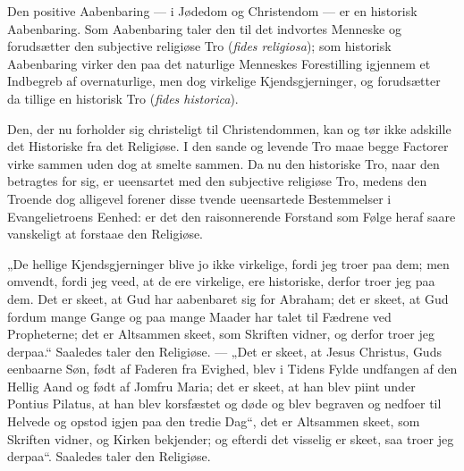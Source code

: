 \documentclass[12pt,a4paper]{book}
\newcommand{\opage}[1]{\marginnote{\footnotesize\textit{[#1]}}}
\begin{document}
\opage{14} Den positive Aabenbaring --- i Jødedom og Christendom --- er en historisk
Aabenbaring. Som Aabenbaring taler den til det indvortes Menneske og
forudsætter den subjective religiøse Tro (\textit{fides religiosa}); som
historisk Aabenbaring virker den paa det naturlige Menneskes Forestilling
igjennem et Indbegreb af overnaturlige, men dog virkelige Kjendsgjerninger, og
forudsætter da tillige en historisk Tro (\textit{fides historica}).

Den, der nu forholder sig christeligt til Christendommen, kan og tør ikke
adskille det Historiske fra det Religiøse. I den sande og levende Tro maae
begge Factorer virke sammen uden dog at smelte sammen. Da nu den historiske
Tro, naar den betragtes for sig, er ueensartet med den subjective religiøse
Tro, medens den Troende dog alligevel forener disse tvende ueensartede
Bestemmelser i Evangelietroens Eenhed: er det den raisonnerende Forstand som
Følge heraf saare vanskeligt at forstaae den Religiøse.

„De hellige Kjendsgjerninger blive jo ikke virkelige, fordi jeg troer paa dem;
men omvendt, fordi jeg veed, at de ere virkelige, ere historiske, derfor troer
jeg paa dem. Det er skeet, at
\opage{15} Gud har aabenbaret sig for Abraham; det er skeet, at Gud fordum mange Gange og
paa mange Maader har talet til Fædrene ved Propheterne; det er Altsammen skeet,
som Skriften vidner, og derfor troer jeg derpaa.“ Saaledes taler den Religiøse.
--- „Det er skeet, at Jesus Christus, Guds eenbaarne Søn, født af Faderen fra
Evighed, blev i Tidens Fylde undfangen af den Hellig Aand og født af Jomfru
Maria; det er skeet, at han blev piint under Pontius Pilatus, at han blev
korsfæstet og døde og blev begraven og nedfoer til Helvede og opstod igjen paa
den tredie Dag“, det er Altsammen skeet, som Skriften vidner, og Kirken
bekjender; og efterdi det visselig er skeet, saa troer jeg derpaa“. Saaledes
taler den Religiøse.
\end{document}
